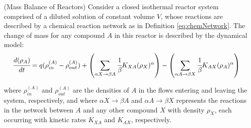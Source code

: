 \documentclass[a4paper,11pt]{book}
\numberwithin{figure}{chapter}
\numberwithin{equation}{chapter}
\numberwithin{table}{chapter}
\newtheorem{theorem}{Theorem}[chapter]
\theoremstyle{definition}
\newcounter{boxed-theorem}
\newenvironment{boxed-theorem}[1]
{\begin{shaded} \begin{theorem}{#1}}
{\end{theorem} \end{shaded}}
\newcounter{boxed-definition}
\begin{document}
\begin{boxed-theorem}{(Mass Balance of Reactors)} \label{th:isoReactSys01}
    Consider a closed isothermal reactor system comprised of a diluted solution of constant volume $V$, whose reactions are described by a chemical reaction network as in Definition \ref{eq:chemNetwork}. The change of mass for any compound $A$ in this reactor is described by the dynamical model:
    \begin{equation} \label{eq:isoModel1}
    		\cfrac{d (\rho_A)}{dt} = q (\rho^{(A)}_{in} - \rho^{(A)}_{out}) + \left( \sum_{\alpha X \rightarrow \beta A} \cfrac{1}{\beta} K_{XA} (\rho_X)^{\alpha} \right) - \left(\sum_{\alpha A \rightarrow \beta X} \cfrac{1}{\beta} K_{AX} (\rho_A)^{\alpha} \right)
    \end{equation}

    \noindent where $\rho^{(A)}_{in}$ and $\rho^{(A)}_{out}$ are the densities of $A$ in the flows entering and leaving the system, respectively, and where $\alpha X \rightarrow \beta A$ and $\alpha A \rightarrow \beta X$ represents the reactions in the network between $A$ and any other compound $X$ with density $\rho_X$, each occurring with kinetic rates $K_{XA}$ and $K_{AX}$, respectively.
\end{boxed-theorem}
\end{document}
